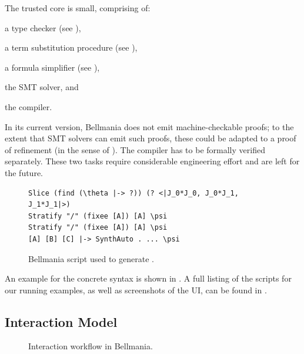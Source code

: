 The trusted core is small, comprising of:
\begin{enumerate*}[label=(\textit{\alph*})]
 \item a type checker (see ), 
 \item a term substitution procedure (see ),
 \item a formula simplifier (see ),
 \item the SMT solver, and
 \item the compiler.
\end{enumerate*}
In its current version, Bellmania does not emit machine-checkable
proofs; to the extent that SMT solvers can emit such proofs,
these could be adapted to a proof of refinement (in the sense of \cite{POPL15/Delaware}).
The compiler has to be formally verified separately.
These two tasks require considerable engineering effort and are left for the future.

\begin{figure}
\vspace{-.5em}%
\begin{lstlisting}[language=bellmania]
Slice (find (\theta |-> ?)) (? <|J_0*J_0, J_0*J_1, J_1*J_1|>)
Stratify "/" (fixee [A]) [A] \psi
Stratify "/" (fixee [A]) [A] \psi
[A] [B] [C] |-> SynthAuto . ... \psi
\end{lstlisting}
\caption{\label{overview:script}
  Bellmania script used to generate .}
\end{figure}

An example for the concrete syntax is shown in .
A full listing of the scripts for our running examples,
as well as screenshots of the UI, can be found
in .

\subsection*{Interaction Model}

\begin{figure}[b!]
\caption{\label{overview:flow}
  Interaction workflow in Bellmania.}
\end{figure}


